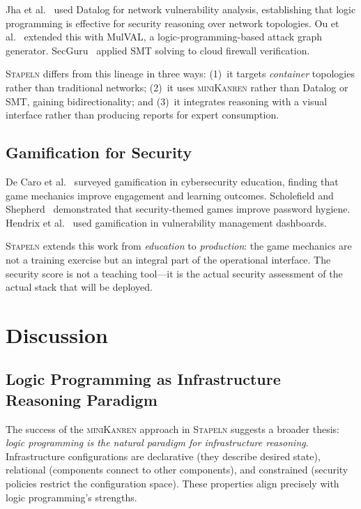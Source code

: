 \documentclass[11pt,twocolumn]{article}
\newcommand{\stapeln}{\textsc{Stapeln}\xspace}
\newcommand{\minikanren}{\textsc{miniKanren}\xspace}
\begin{document}
Jha et al.~\cite{jha2002} used Datalog for network vulnerability
analysis, establishing that logic programming is effective for
security reasoning over network topologies. Ou et al.~\cite{ou2005}
extended this with MulVAL, a logic-programming-based attack graph
generator. SecGuru~\cite{secguru2017} applied SMT solving to
cloud firewall verification.

\stapeln differs from this lineage in three ways: (1)~it targets
\emph{container} topologies rather than traditional networks;
(2)~it uses \minikanren rather than Datalog or SMT, gaining
bidirectionality; and (3)~it integrates reasoning with a visual
interface rather than producing reports for expert consumption.

\subsection{Gamification for Security}

De Caro et al.~\cite{deCaro2024} surveyed gamification in
cybersecurity education, finding that game mechanics improve
engagement and learning outcomes. Scholefield and
Shepherd~\cite{scholefield2019} demonstrated that security-themed
games improve password hygiene. Hendrix et al.~\cite{hendrix2016}
used gamification in vulnerability management dashboards.

\stapeln extends this work from \emph{education} to
\emph{production}: the game mechanics are not a training exercise
but an integral part of the operational interface. The security
score is not a teaching tool---it is the actual security assessment
of the actual stack that will be deployed.


\section{Discussion}
\label{sec:discussion}

\subsection{Logic Programming as Infrastructure Reasoning Paradigm}

The success of the \minikanren approach in \stapeln suggests a broader
thesis: \emph{logic programming is the natural paradigm for
infrastructure reasoning}. Infrastructure configurations are
declarative (they describe desired state), relational (components
connect to other components), and constrained (security policies
restrict the configuration space). These properties align precisely
with logic programming's strengths.
\end{document}
